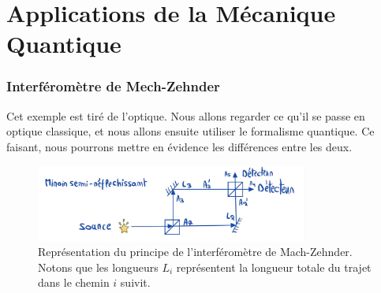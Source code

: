 \documentclass[../notesdecours.tex]{subfiles}
\begin{document}
\part{Applications de la Mécanique Quantique}
\section{Interféromètre de Mech-Zehnder}
Cet exemple est tiré de l'optique. Nous allons regarder ce qu'il se passe en optique classique, et nous allons ensuite utiliser le formalisme quantique. Ce faisant, nous pourrons mettre en évidence les différences entre les deux. \\

\begin{center}
\begin{figure}[h]
\centering
\includegraphics[width=0.80\textwidth]{Mach-Zehnder.png}
\caption{Représentation du principe de l'interféromètre de Mach-Zehnder. Notons que les longueurs $L_i$ représentent la longueur totale du trajet dans le chemin $i$ suivit.}
\end{figure}
\end{center}
\end{document}
